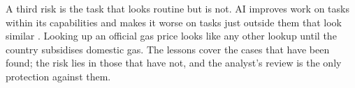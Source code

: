 A third risk is the task that looks routine but is not.
AI improves work on tasks within its capabilities and makes it worse on tasks just outside them that look similar \citep{dellacqua2026navigating}.
Looking up an official gas price looks like any other lookup until the country subsidises domestic gas.
The lessons cover the cases that have been found; the risk lies in those that have not, and the analyst's review is the only protection against them.
